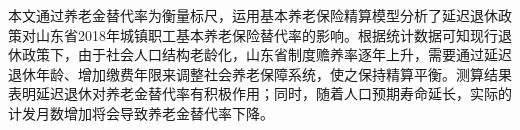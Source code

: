 本文通过养老金替代率为衡量标尺，运用基本养老保险精算模型分析了延迟退休政策对山东省2018年城镇职工基本养老保险替代率的影响。根据统计数据可知现行退休政策下，由于社会人口结构老龄化，山东省制度赡养率逐年上升，需要通过延迟退休年龄、增加缴费年限来调整社会养老保障系统，使之保持精算平衡。测算结果表明延迟退休对养老金替代率有积极作用；同时，随着人口预期寿命延长，实际的计发月数增加将会导致养老金替代率下降。